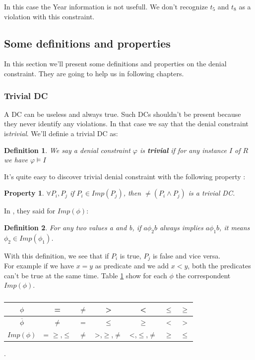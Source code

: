 \documentclass[letterpaper, 12pt]{report}
\newtheorem{mydef}{Definition}
\newtheorem{myprop}{Property}
\begin{document}
In this case the Year information is not usefull. We don't recognize $t_5$ and $t_8$ as a violation with this constraint.

\subsection{Some definitions and properties}

In this section we'll present some definitions and properties on the denial constraint. They are going to help us in following chapters.

\subsubsection{Trivial DC}

A DC can be useless and always true. Such DCs shouldn't be present because they never identify any violations. In that case we say that the denial constraint is\emph{trivial}. We'll definie a trivial DC as:

\begin{mydef}
	We say a denial constraint $\varphi$ is \textbf{trivial} if for any instance $I$  of $R$ we have $\varphi \models I$
\end{mydef}

It's quite easy to discover trivial denial constraint with the following property \cite{DCs}:

\begin{myprop}
 $\forall P_i, P_j$ if $P_i \in Imp(P_j)$, then $\neq(P_i \wedge P_j)$ is a trivial DC.
\end{myprop}

In \cite{main}, they said for $Imp(\phi)$:

\begin{mydef} For any two values a and b, if $a \phi_2 b$ always implies $a \phi_1 b$, it means $\phi_2 \in Imp(\phi_1)$.
\end{mydef}

With this definition, we see that if $P_i$ is true, $P_j$ is false and vice versa.\\

For example if we have $x = y$ as predicate and we add $x < y$, both the predicates can't be true at the same time. Table \ref{tableImp} show for each $\phi$ the correspondent $Imp(\phi)$.

\begin{table}[H]
	\centering
	\begin{tabular}{|c|c|c|c|c|c|c|}
	\hline
	   $ \phi$ & = & $\neq$ & > & < & $\leq$& $\geq$\\
	   \hline
	   $ \overline{\phi}$ & $\neq$ & = & $\leq$ & $\geq$ & < & >\\
	   \hline
	   $Imp(\phi)$ & = $\geq$,$\leq$ & $\neq$ & >,$\geq$,$\neq$ & <,$\leq$,$\neq$ & $\geq$ & $\leq$ \\
	\hline
	 
	 \hline
	\end{tabular}
	\caption{\label{tableImp}}.
\end{table}
\end{document}
